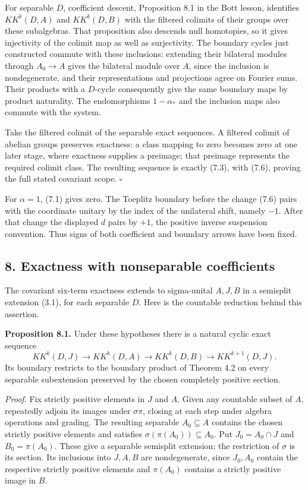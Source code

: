 \documentclass[
  11pt,
]{article}
\begin{document}
For separable \(D\), coefficient descent, Proposition 8.1 in the Bott
lesson, identifies \(KK^k(D,A)\) and \(KK^k(D,B)\) with the filtered
colimits of their groups over these subalgebras. That proposition also
descends null homotopies, so it gives injectivity of the colimit map as
well as surjectivity. The boundary cycles just constructed commute with
these inclusions: extending their bilateral modules through \(A_0\to A\)
gives the bilateral module over \(A\), since the inclusion is
nondegenerate, and their representations and projections agree on
Fourier sums. Their products with a \(D\)-cycle consequently give the
same boundary maps by product naturality. The endomorphisms
\(1-\alpha_*\) and the inclusion maps also commute with the system.

Take the filtered colimit of the separable exact sequences. A filtered
colimit of abelian groups preserves exactness: a class mapping to zero
becomes zero at one later stage, where exactness supplies a preimage;
that preimage represents the required colimit class. The resulting
sequence is exactly (7.3), with (7.6), proving the full stated covariant
scope. \(\square\)

For \(\alpha=1\), (7.1) gives zero. The Toeplitz boundary before the
change (7.6) pairs with the coordinate unitary by the index of the
unilateral shift, namely \(-1\). After that change the displayed \(d\)
pairs by \(+1\), the positive inverse suspension convention. Thus signs
of both coefficient and boundary arrows have been fixed.

\subsection{8. Exactness with nonseparable
coefficients}\label{exactness-with-nonseparable-coefficients}

The covariant six-term exactness extends to sigma-unital \(A,J,B\) in a
semisplit extension (3.1), for each separable \(D\). Here is the
countable reduction behind this assertion.

\textbf{Proposition 8.1.} Under these hypotheses there is a natural
cyclic exact sequence \[
KK^k(D,J)\longrightarrow KK^k(D,A)
\longrightarrow KK^k(D,B)
\longrightarrow KK^{k+1}(D,J).
\tag{8.1}
\] Its boundary restricts to the boundary product of Theorem 4.2 on
every separable subextension preserved by the chosen completely positive
section.

\emph{Proof.} Fix strictly positive elements in \(J\) and \(A\). Given
any countable subset of \(A\), repeatedly adjoin its images under
\(\sigma\pi\), closing at each step under algebra operations and
grading. The resulting separable \(A_0\subseteq A\) contains the chosen
strictly positive elements and satisfies
\(\sigma(\pi(A_0))\subseteq A_0\). Put \(J_0=A_0\cap J\) and
\(B_0=\pi(A_0)\). These give a separable semisplit extension; the
restriction of \(\sigma\) is its section. Its inclusions into \(J,A,B\)
are nondegenerate, since \(J_0,A_0\) contain the respective strictly
positive elements and \(\pi(A_0)\) contains a strictly positive image in
\(B\).
\end{document}
